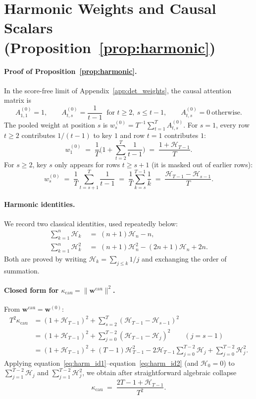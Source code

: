 \documentclass{article}
\def\eqref#1{equation~\ref{#1}}
\def\vw{{\bm{w}}}
\newcommand{\cau}{\mathrm{cau}}
\begin{document}
\section{Harmonic Weights and Causal Scalars (Proposition~\ref{prop:harmonic})}\label{app:harmonic}

\paragraph{Proof of Proposition~\ref{prop:harmonic}.}
In the score-free limit of Appendix~\ref{app:det_weights}, the causal attention matrix is
\[
    A_{1,1}^{(0)}=1,\qquad A_{t,s}^{(0)}=\frac{1}{t-1}\ \text{ for } t\geq 2,\ s\leq t-1,\qquad A_{t,s}^{(0)}=0\ \text{otherwise}.
\]
The pooled weight at position $s$ is $w_s^{(0)}=T^{-1}\sum_{t=1}^T A_{t,s}^{(0)}$. For $s=1$, every row $t\geq 2$ contributes $1/(t-1)$ to key $1$ and row $t=1$ contributes $1$:
\[
    w_1^{(0)} \;=\; \frac{1}{T}\Big(1+\sum_{t=2}^T\frac{1}{t-1}\Big) \;=\; \frac{1+\mathcal{H}_{T-1}}{T}.
\]
For $s\geq 2$, key $s$ only appears for rows $t\geq s+1$ (it is masked out of earlier rows):
\[
    w_s^{(0)} \;=\; \frac{1}{T}\sum_{t=s+1}^T \frac{1}{t-1} \;=\; \frac{1}{T}\sum_{k=s}^{T-1}\frac{1}{k} \;=\; \frac{\mathcal{H}_{T-1}-\mathcal{H}_{s-1}}{T}.
\]

\paragraph{Harmonic identities.}
We record two classical identities, used repeatedly below:
\begin{align}
    \sum_{k=1}^n \mathcal{H}_k &\;=\; (n+1)\mathcal{H}_n - n, \label{eq:harm_id1}\\
    \sum_{k=1}^n \mathcal{H}_k^2 &\;=\; (n+1)\mathcal{H}_n^2 - (2n+1)\mathcal{H}_n + 2n. \label{eq:harm_id2}
\end{align}
Both are proved by writing $\mathcal{H}_k=\sum_{j\le k}1/j$ and exchanging the order of summation.

\paragraph{Closed form for $\kappa_\cau=\|\vw^\cau\|^2$.}
From $\vw^\cau=\vw^{(0)}$:
\begin{align*}
    T^2\kappa_\cau
    &= (1+\mathcal{H}_{T-1})^2 + \sum_{s=2}^T(\mathcal{H}_{T-1}-\mathcal{H}_{s-1})^2 \\
    &= (1+\mathcal{H}_{T-1})^2 + \sum_{j=0}^{T-2}(\mathcal{H}_{T-1}-\mathcal{H}_j)^2 \qquad (j=s-1)\\
    &= (1+\mathcal{H}_{T-1})^2 + (T-1)\mathcal{H}_{T-1}^2 - 2\mathcal{H}_{T-1}\sum_{j=0}^{T-2}\mathcal{H}_j + \sum_{j=0}^{T-2}\mathcal{H}_j^2.
\end{align*}
Applying \eqref{eq:harm_id1}--\eqref{eq:harm_id2} (and $\mathcal{H}_0=0$) to $\sum_{j=1}^{T-2}\mathcal{H}_j$ and $\sum_{j=1}^{T-2}\mathcal{H}_j^2$, we obtain after straightforward algebraic collapse
\begin{equation}\label{eq:kappa_cau_app}
    \kappa_\cau \;=\; \frac{2T-1+\mathcal{H}_{T-1}}{T^2}.
\end{equation}
\end{document}
